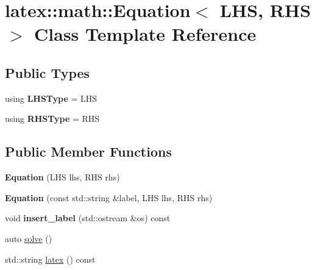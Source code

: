 \hypertarget{classlatex_1_1math_1_1Equation}{\section{latex\-:\-:math\-:\-:Equation$<$ L\-H\-S, R\-H\-S $>$ Class Template Reference}
\label{classlatex_1_1math_1_1Equation}
}
\subsection*{Public Types}
\begin{DoxyCompactItemize}
\item 
\hypertarget{classlatex_1_1math_1_1Equation_aa9edc347823879f6651a4b3dbe31060f}{using {\bfseries L\-H\-S\-Type} = L\-H\-S}\label{classlatex_1_1math_1_1Equation_aa9edc347823879f6651a4b3dbe31060f}

\item 
\hypertarget{classlatex_1_1math_1_1Equation_a70e604aaab38b87af4df46932fab25cc}{using {\bfseries R\-H\-S\-Type} = R\-H\-S}\label{classlatex_1_1math_1_1Equation_a70e604aaab38b87af4df46932fab25cc}

\end{DoxyCompactItemize}
\subsection*{Public Member Functions}
\begin{DoxyCompactItemize}
\item 
\hypertarget{classlatex_1_1math_1_1Equation_abf2df112f6302c99b56fa31927142d33}{{\bfseries Equation} (L\-H\-S lhs, R\-H\-S rhs)}\label{classlatex_1_1math_1_1Equation_abf2df112f6302c99b56fa31927142d33}

\item 
\hypertarget{classlatex_1_1math_1_1Equation_a354a3d509dd259c1c0b51ab915867169}{{\bfseries Equation} (const std\-::string \&label, L\-H\-S lhs, R\-H\-S rhs)}\label{classlatex_1_1math_1_1Equation_a354a3d509dd259c1c0b51ab915867169}

\item 
\hypertarget{classlatex_1_1math_1_1Equation_a8c74a11c75dee6f3ab7f92a322942704}{void {\bfseries insert\-\_\-label} (std\-::ostream \&os) const }\label{classlatex_1_1math_1_1Equation_a8c74a11c75dee6f3ab7f92a322942704}

\item 
auto \hyperlink{classlatex_1_1math_1_1Equation_a07edd6119b4c578f0bd109501284120b}{solve} ()
\item 
std\-::string \hyperlink{classlatex_1_1math_1_1Equation_acc052b3d3d93f32438ada7338b641d6e}{latex} () const 
\end{DoxyCompactItemize}
